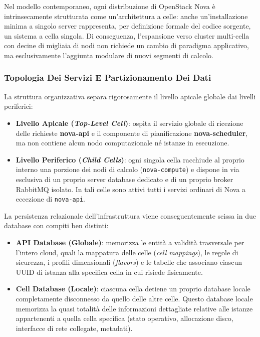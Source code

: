 \documentclass[11pt, a4paper]{article}
\begin{document}
Nel modello contemporaneo, ogni distribuzione di OpenStack Nova è intrinsecamente strutturata come un'architettura a celle: anche un'installazione minima a singolo server rappresenta, per definizione formale del codice sorgente, un sistema a cella singola. Di conseguenza, l'espansione verso cluster multi-cella con decine di migliaia di nodi non richiede un cambio di paradigma applicativo, ma esclusivamente l'aggiunta modulare di nuovi segmenti di calcolo.


\subsubsection{Topologia Dei Servizi E Partizionamento Dei Dati}

La struttura organizzativa separa rigorosamente il livello apicale globale dai livelli periferici:
\begin{itemize}[leftmargin=*]
    \item \textbf{Livello Apicale (\emph{Top-Level Cell})}: ospita il servizio globale di ricezione delle richieste \textbf{nova-api} e il componente di pianificazione \textbf{nova-scheduler}, ma non contiene alcun nodo computazionale né istanze in esecuzione.
    \item \textbf{Livello Periferico (\emph{Child Cells})}: ogni singola cella racchiude al proprio interno una porzione dei nodi di calcolo (\texttt{nova-compute}) e dispone in via esclusiva di un proprio server database dedicato e di un proprio broker RabbitMQ isolato. In tali celle sono attivi tutti i servizi ordinari di Nova a eccezione di \texttt{nova-api}.
\end{itemize}

La persistenza relazionale dell'infrastruttura viene conseguentemente scissa in due database con compiti ben distinti:
\begin{itemize}
    \item \textbf{API Database (Globale)}: memorizza le entità a validità trasversale per l'intero cloud, quali la mappatura delle celle (\emph{cell mappings}), le regole di sicurezza, i profili dimensionali (\emph{flavors}) e le tabelle che associano ciascun UUID di istanza alla specifica cella in cui risiede fisicamente.
    \item \textbf{Cell Database (Locale)}: ciascuna cella detiene un proprio database locale completamente disconnesso da quello delle altre celle. Questo database locale memorizza la quasi totalità delle informazioni dettagliate relative alle istanze appartenenti a quella cella specifica (stato operativo, allocazione disco, interfacce di rete collegate, metadati).
\end{itemize}
\end{document}
